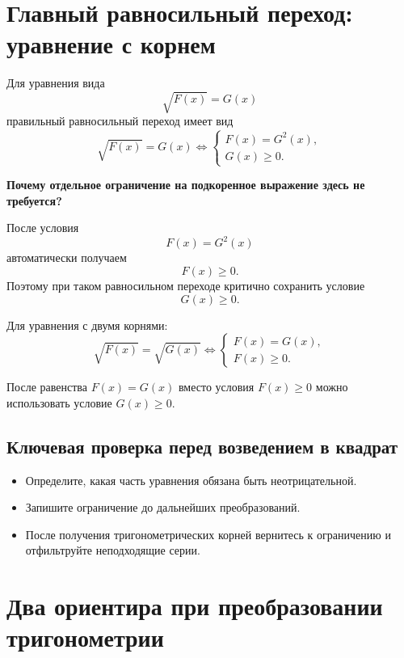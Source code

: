 \documentclass[a4paper,12pt]{article}
\begin{document}
\hypersetup{pageanchor=true}


\section{Главный равносильный переход: уравнение с корнем}

Для уравнения вида
\[
\sqrt{F(x)}=G(x)
\]
правильный равносильный переход имеет вид
\[
\boxed{
\sqrt{F(x)}=G(x)
\iff
\begin{cases}
F(x)=G^2(x),\\
G(x)\ge 0.
\end{cases}}
\]

\begin{keybox}
\textbf{Почему отдельное ограничение на подкоренное выражение здесь не требуется?}

После условия
\[
F(x)=G^2(x)
\]
автоматически получаем
\[
F(x)\ge0.
\]
Поэтому при таком равносильном переходе критично сохранить условие
\[
G(x)\ge0.
\]
\end{keybox}

Для уравнения с двумя корнями:
\[
\sqrt{F(x)}=\sqrt{G(x)}
\iff
\begin{cases}
F(x)=G(x),\\
F(x)\ge0.
\end{cases}
\]

После равенства \(F(x)=G(x)\) вместо условия \(F(x)\ge0\)
можно использовать условие \(G(x)\ge0\).

\subsection{Ключевая проверка перед возведением в квадрат}

\begin{itemize}
  \item Определите, какая часть уравнения обязана быть неотрицательной.
  \item Запишите ограничение до дальнейших преобразований.
  \item После получения тригонометрических корней вернитесь к ограничению и отфильтруйте неподходящие серии.
\end{itemize}

\section{Два ориентира при преобразовании тригонометрии}
\end{document}

